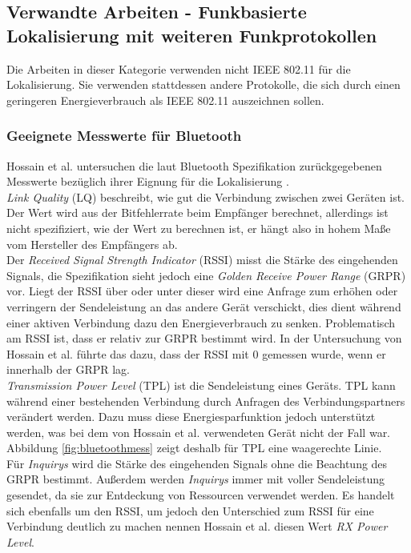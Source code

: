 \subsection{Verwandte Arbeiten - Funkbasierte Lokalisierung mit weiteren Funkprotokollen}
Die Arbeiten in dieser Kategorie verwenden nicht IEEE 802.11 für die Lokalisierung.
Sie verwenden stattdessen andere Protokolle, die sich durch einen geringeren Energieverbrauch als IEEE 802.11 auszeichnen sollen.

\subsubsection{Geeignete Messwerte für Bluetooth}
\label{ch:Vorherige:sec:param}
Hossain et al. untersuchen die laut Bluetooth Spezifikation zurückgegebenen Messwerte bezüglich ihrer Eignung für die Lokalisierung \cite{hossain2007comprehensive}.\\ 
\emph{Link Quality} (LQ) beschreibt, wie gut die Verbindung zwischen zwei Geräten ist.
Der Wert wird aus der Bitfehlerrate beim Empfänger berechnet, allerdings ist nicht spezifiziert, wie der Wert zu berechnen ist, er hängt also in hohem Maße vom Hersteller des Empfängers ab. \\
Der \emph{Received Signal Strength Indicator} (RSSI) misst die Stärke des eingehenden Signals, die Spezifikation sieht jedoch eine \emph{Golden Receive Power Range} (GRPR) vor. 
Liegt der RSSI über oder unter dieser wird eine Anfrage zum erhöhen oder verringern der Sendeleistung an das andere Gerät verschickt, dies dient während einer aktiven Verbindung dazu den Energieverbrauch zu senken.
Problematisch am RSSI ist, dass er relativ zur GRPR bestimmt wird.
In der Untersuchung von Hossain et al. führte das dazu, dass der RSSI mit 0 gemessen wurde, wenn er innerhalb der GRPR lag. \\
\emph{Transmission Power Level} (TPL) ist die Sendeleistung eines Geräts. 
TPL kann während einer bestehenden Verbindung durch Anfragen des Verbindungspartners verändert werden.
Dazu muss diese Energiesparfunktion jedoch unterstützt werden, was bei dem von Hossain et al. verwendeten Gerät nicht der Fall war.
Abbildung \ref{fig:bluetoothmess} zeigt deshalb für TPL eine waagerechte Linie.\\
Für \emph{Inquirys} wird die Stärke des eingehenden Signals ohne die Beachtung des GRPR bestimmt.
Außerdem werden \emph{Inquirys} immer mit voller Sendeleistung gesendet, da sie zur Entdeckung von Ressourcen verwendet werden.
Es handelt sich ebenfalls um den RSSI, um jedoch den Unterschied zum RSSI für eine Verbindung deutlich zu machen nennen Hossain et al. diesen Wert \emph{RX Power Level}.

